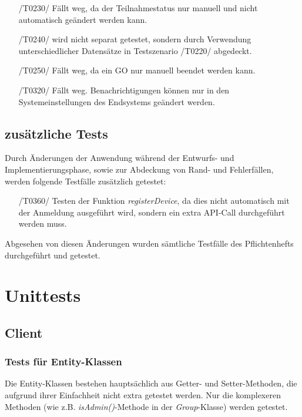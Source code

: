 \documentclass[11pt,a4paper]{scrartcl}
\begin{document}
\begin{itemize}
	\item[/T0230/] Fällt weg, da der Teilnahmestatus nur manuell und nicht automatisch geändert werden kann.
	
	\item[/T0240/] wird nicht separat getestet, sondern durch Verwendung unterschiedlicher Datensätze in Testszenario /T0220/ abgedeckt.
	
	\item[/T0250/] Fällt weg, da ein GO nur manuell beendet werden kann.
	
	\item[/T0320/] Fällt weg. Benachrichtigungen können nur in den Systemeinstellungen des Endsystems geändert werden.
	
\end{itemize}

\subsection{zusätzliche Tests}
Durch Änderungen der Anwendung während der Entwurfs- und Implementierungsphase, sowie zur Abdeckung von Rand- und Fehlerfällen, werden folgende Testfälle zusätzlich getestet:
\begin{itemize}
	\item[/T0360/]\label{360} Testen der Funktion \textit{registerDevice}, da dies nicht automatisch mit der Anmeldung ausgeführt wird, sondern ein extra API-Call durchgeführt werden muss.
\end{itemize}
Abgesehen von diesen Änderungen wurden sämtliche Testfälle des Pflichtenhefts durchgeführt und getestet.

\newpage

\section{Unittests}

\subsection{Client}

\subsubsection{Tests für Entity-Klassen}
Die Entity-Klassen bestehen hauptsächlich aus Getter- und Setter-Methoden, die aufgrund ihrer Einfachheit nicht extra getestet werden. Nur die komplexeren Methoden (wie z.B. \textit{isAdmin()}-Methode in der \textit{Group}-Klasse) werden getestet.
\end{document}
